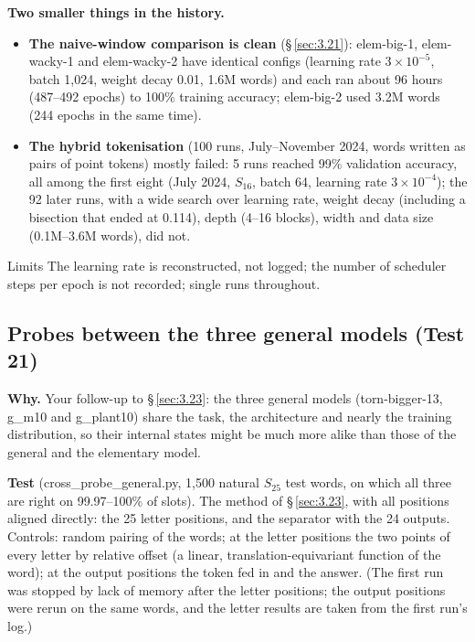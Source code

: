 \documentclass[paper=a4,fontsize=11pt,DIV=11,parskip=half,headings=small,numbers=noendperiod]{scrartcl}
\DeclareRobustCommand{\lead}[1]{\textsf{\bfseries\color{accent}#1}}
\DeclareRobustCommand{\code}[1]{{\fontseries{m}\ttfamily #1}}
\begin{document}
\lead{Two smaller things in the history.}

\begin{itemize}
\item \lead{The naive-window comparison is clean} (\S\,\ref{sec:3.21}):
  \code{elem-\allowbreak{}big-\allowbreak{}1}, \code{elem-\allowbreak{}wacky-\allowbreak{}1} and
  \code{elem-\allowbreak{}wacky-\allowbreak{}2} have identical configs (learning rate $3\times10^{-5}$, batch
  1,024, weight decay 0.01, 1.6M words) and each ran about 96 hours (487–492 epochs) to 100\% training accuracy;
  \code{elem-\allowbreak{}big-\allowbreak{}2} used 3.2M words (244 epochs in the same time).
\item \lead{The hybrid tokenisation} (100 runs, July–November 2024, words written as pairs of point tokens)
  mostly failed: 5 runs reached 99\% validation accuracy, all among the first eight (July 2024, $S_{16}$, batch
  64, learning rate $3\times10^{-4}$); the 92 later runs, with a wide search over learning rate, weight decay
  (including a bisection that ended at 0.114), depth (4–16 blocks), width and data size (0.1M–3.6M words), did
  not.
\end{itemize}

\begin{limbox}{Limits}
The learning rate is reconstructed, not logged; the number of scheduler steps per epoch is not recorded; single
runs throughout.
\end{limbox}

\subsection{Probes between the three general models (Test 21)}\label{sec:3.25}
\lead{Why.} Your follow-up to \S\,\ref{sec:3.23}: the three general models
(\code{torn-\allowbreak{}bigger-\allowbreak{}13}, \code{g\_\allowbreak{}m10} and \code{g\_\allowbreak{}plant10})
share the task, the architecture and nearly the training distribution, so their internal states might be much
more alike than those of the general and the elementary model.

\lead{Test} (\code{cross\_\allowbreak{}probe\_\allowbreak{}general.\allowbreak{}py}, 1,500 natural $S_{25}$ test
words, on which all three are right on 99.97–100\% of slots). The method of \S\,\ref{sec:3.23}, with all
positions aligned directly: the 25 letter positions, and the separator with the 24 outputs. Controls: random
pairing of the words; at the letter positions the two points of every letter by relative offset (a linear,
translation-equivariant function of the word); at the output positions the token fed in and the answer. (The
first run was stopped by lack of memory after the letter positions; the output positions were rerun on the same
words, and the letter results are taken from the first run’s log.)
\end{document}
